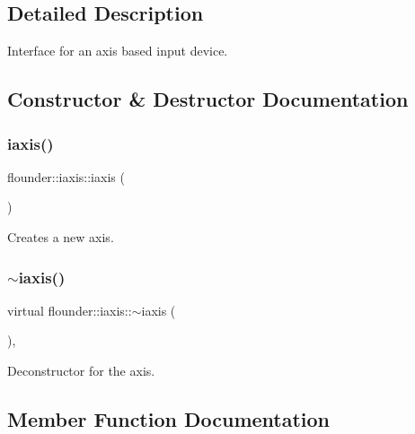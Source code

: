 \subsection{Detailed Description}
Interface for an axis based input device. 



\subsection{Constructor \& Destructor Documentation}
\mbox{\label{classflounder_1_1iaxis_a0f181144a1e6cd74008fdf0dbff1db4c}} 
\subsubsection{\texorpdfstring{iaxis()}{iaxis()}}
{\footnotesize\ttfamily flounder\+::iaxis\+::iaxis (\begin{DoxyParamCaption}{ }\end{DoxyParamCaption})\hspace{0.3cm}{\ttfamily [inline]}}



Creates a new axis. 

\mbox{\label{classflounder_1_1iaxis_ad0c72fa9b05f3151dbefc48ce7249f66}} 
\subsubsection{\texorpdfstring{$\sim$iaxis()}{~iaxis()}}
{\footnotesize\ttfamily virtual flounder\+::iaxis\+::$\sim$iaxis (\begin{DoxyParamCaption}{ }\end{DoxyParamCaption})\hspace{0.3cm}{\ttfamily [inline]}, {\ttfamily [virtual]}}



Deconstructor for the axis. 



\subsection{Member Function Documentation}
\mbox{\label{classflounder_1_1iaxis_a990ecb5ffa5ec07b3d5e2e4016b2e4a0}} 
